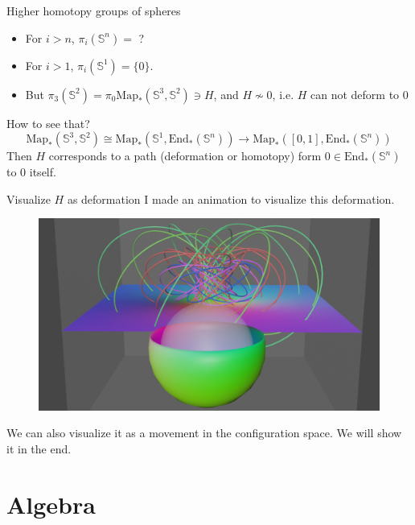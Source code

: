 \documentclass[12pt]{beamer}
\begin{document}
\begin{frame}{Higher homotopy groups of spheres}
\begin{itemize}
  \item For $i>n$, $\pi_i(\mathbb{S}^n) = $ ?
    \pause
  \item For $i>1$, $ \pi_i(\mathbb{S}^1) =\{0\}$.
    \pause
  \item But $\pi_3(\mathbb{S}^2) = \pi_0 \mathrm{Map}_*(\mathbb{S}^3,\mathbb{S}^2) \ni H $, and $H \nsim 0 $, i.e. $H$ can not deform to $0$
\end{itemize}
How to see that?
\pause
\[
  \mathrm{Map}_*(\mathbb{S}^3,\mathbb{S}^2) \cong \mathrm{Map}_*(\mathbb{S}^1,\mathrm{End}_*(\mathbb{S}^n))\to \mathrm{Map}_*([0,1],\mathrm{End}_*(\mathbb{S}^n))
\]
Then $H$ corresponds to a path (deformation or homotopy) form $0\in \mathrm{End}_*(\mathbb{S}^n)$ to $0$ itself.

\end{frame}
\begin{frame}{Visualize $H$ as deformation}
  I made an animation to visualize this deformation.
  \begin{figure}
    \begin{center}
      \href{https://www.youtube.com/watch?v=TnBWwh7I3aA}{ \includegraphics[height=0.3\textheight]{figures/hopf_homotopy.png} }
    \end{center}
  \end{figure}
  \pause
  We can also visualize it as a movement in the configuration space. We will show it in the end.
 


\end{frame}
\section{Algebra}
\end{document}
